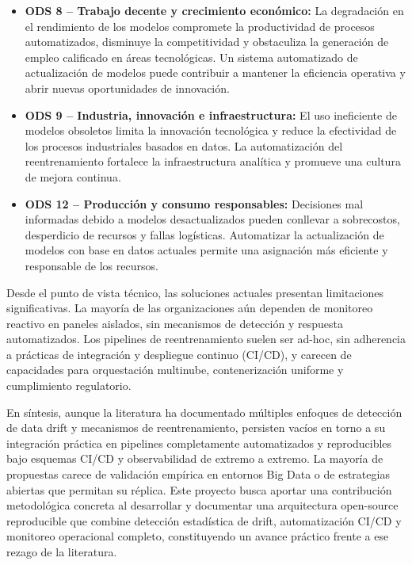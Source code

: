 \begin{itemize}
  \item \textbf{ODS 8 – Trabajo decente y crecimiento económico:} La degradación en el rendimiento de los modelos compromete la productividad de procesos automatizados, disminuye la competitividad y obstaculiza la generación de empleo calificado en áreas tecnológicas. Un sistema automatizado de actualización de modelos puede contribuir a mantener la eficiencia operativa y abrir nuevas oportunidades de innovación.

  \item \textbf{ODS 9 – Industria, innovación e infraestructura:} El uso ineficiente de modelos obsoletos limita la innovación tecnológica y reduce la efectividad de los procesos industriales basados en datos. La automatización del reentrenamiento fortalece la infraestructura analítica y promueve una cultura de mejora continua.

  \item \textbf{ODS 12 – Producción y consumo responsables:} Decisiones mal informadas debido a modelos desactualizados pueden conllevar a sobrecostos, desperdicio de recursos y fallas logísticas. Automatizar la actualización de modelos con base en datos actuales permite una asignación más eficiente y responsable de los recursos.
\end{itemize}

Desde el punto de vista técnico, las soluciones actuales presentan limitaciones significativas. La mayoría de las organizaciones aún dependen de monitoreo reactivo en paneles aislados, sin mecanismos de detección y respuesta automatizados. Los pipelines de reentrenamiento suelen ser ad-hoc, sin adherencia a prácticas de integración y despliegue continuo (CI/CD), y carecen de capacidades para orquestación multinube, contenerización uniforme y cumplimiento regulatorio.

En síntesis, aunque la literatura ha documentado múltiples enfoques de detección de data drift y mecanismos de reentrenamiento, persisten vacíos en torno a su integración práctica en pipelines completamente automatizados y reproducibles bajo esquemas CI/CD y observabilidad de extremo a extremo. La mayoría de propuestas carece de validación empírica en entornos Big Data o de estrategias abiertas que permitan su réplica. Este proyecto busca aportar una contribución metodológica concreta al desarrollar y documentar una arquitectura open-source reproducible que combine detección estadística de drift, automatización CI/CD y monitoreo operacional completo, constituyendo un avance práctico frente a ese rezago de la literatura.

